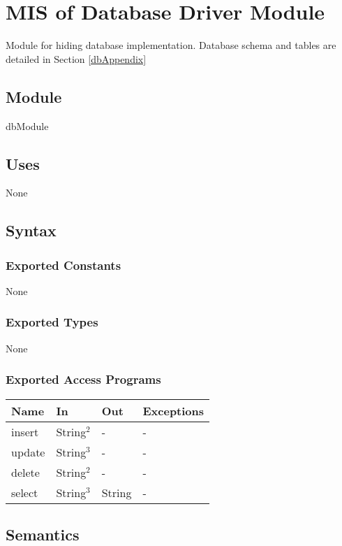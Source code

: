 \documentclass[12pt, titlepage]{article}
\begin{document}
\section{MIS of Database Driver Module} \label{mDBDriver}
Module for hiding database implementation. Database schema and tables are detailed in Section \ref{dbAppendix}

\subsection{Module}
dbModule

\subsection{Uses}
None

\subsection{Syntax}

\subsubsection{Exported Constants}
None

\subsubsection{Exported Types}
None

\subsubsection{Exported Access Programs}

\begin{center}
\begin{tabular}{p{4cm} p{4cm} p{4cm} p{3cm}}
\hline
\textbf{Name} & \textbf{In} & \textbf{Out} & \textbf{Exceptions} \\
\hline
insert & String$^2$ & - & - \\
update & String$^3$ & - & - \\
delete & String$^2$ & - & - \\
select & String$^3$ & String & - \\
\hline
\end{tabular}
\end{center}

\subsection{Semantics}
\end{document}
